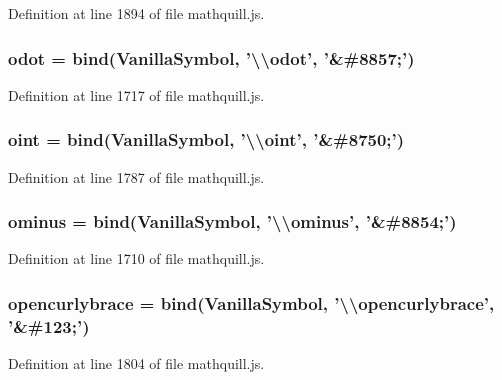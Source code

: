 Definition at line 1894 of file mathquill.\-js.

\subsubsection[{odot}]{ odot = {\bf bind}({\bf Vanilla\-Symbol}, '\textbackslash{}\textbackslash{}odot', '\&\#8857;')}\label{mathquill_8js_a64d5af38f5bc677187a18b66e136aa6e}


Definition at line 1717 of file mathquill.\-js.

\subsubsection[{oint}]{ oint = {\bf bind}({\bf Vanilla\-Symbol}, '\textbackslash{}\textbackslash{}oint', '\&\#8750;')}\label{mathquill_8js_ac2db226d328152348559bee2ac75725e}


Definition at line 1787 of file mathquill.\-js.

\subsubsection[{ominus}]{ ominus = {\bf bind}({\bf Vanilla\-Symbol}, '\textbackslash{}\textbackslash{}ominus', '\&\#8854;')}\label{mathquill_8js_aa7ccbb3d97b1d0e61c16ba42d7b70a59}


Definition at line 1710 of file mathquill.\-js.

\subsubsection[{opencurlybrace}]{ opencurlybrace = {\bf bind}({\bf Vanilla\-Symbol}, '\textbackslash{}\textbackslash{}opencurlybrace', '\&\#123;')}\label{mathquill_8js_aa2381a23b7c9796b50f91554c0ca9f6e}


Definition at line 1804 of file mathquill.\-js.

